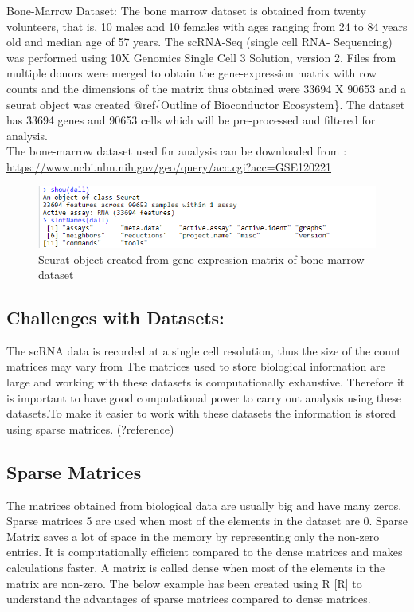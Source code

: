 \documentclass{sydneythesis}
\begin{document}
Bone-Marrow Dataset: The bone marrow dataset is obtained from twenty
volunteers, that is, 10 males and 10 females with ages ranging from 24
to 84 years old and median age of 57 years. The scRNA-Seq (single cell
RNA- Sequencing) was performed using 10X Genomics Single Cell 3
Solution, version 2. Files from multiple donors were merged to obtain
the gene-expression matrix with row counts and the dimensions of the
matrix thus obtained were 33694 X 90653 and a seurat object was created
@ref\{Outline of Bioconductor Ecosystem\}. The dataset has 33694 genes
and 90653 cells which will be pre-processed and filtered for analysis.\\
The bone-marrow dataset used for analysis can be downloaded from :
\url{https://www.ncbi.nlm.nih.gov/geo/query/acc.cgi?acc=GSE120221}

\begin{figure}

{\centering \includegraphics[width=9.21in]{bmobject} 

}

\caption{Seurat object created from gene-expression matrix of bone-marrow dataset}\label{fig:unnamed-chunk-5}
\end{figure}

\subsection{Challenges with Datasets:}\label{challenges-with-datasets}

The scRNA data is recorded at a single cell resolution, thus the size of
the count matrices may vary from The matrices used to store biological
information are large and working with these datasets is computationally
exhaustive. Therefore it is important to have good computational power
to carry out analysis using these datasets.To make it easier to work
with these datasets the information is stored using sparse matrices.
(?reference)

\subsection{Sparse Matrices}\label{sparse-matrices}

The matrices obtained from biological data are usually big and have many
zeros. Sparse matrices 5 are used when most of the elements in the
dataset are 0. Sparse Matrix saves a lot of space in the memory by
representing only the non-zero entries. It is computationally efficient
compared to the dense matrices and makes calculations faster. A matrix
is called dense when most of the elements in the matrix are non-zero.
The below example has been created using R {[}R{]} to understand the
advantages of sparse matrices compared to dense matrices.
\end{document}
